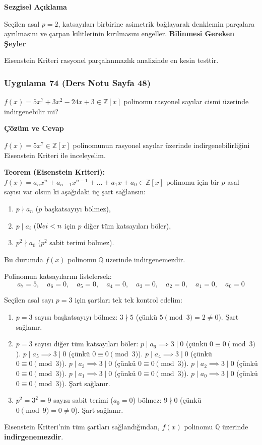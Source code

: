 \documentclass[11pt, a4paper]{article}
\newenvironment{cozum}{
    \vspace{0.5cm}
    \noindent\textcolor{green!60!black}{\faCheckCircle\enspace \textbf{\Large Çözüm ve Cevap}}\par\vspace{0.2cm}
}{}
\newenvironment{sezgisel}{
    \vspace{0.5cm}
    \noindent\textcolor{orange!80!black}{\faLightbulb\enspace \textbf{\Large Sezgisel Açıklama}}\par\vspace{0.2cm}
    \itshape
}{}
\newenvironment{bilgi}{
    \vspace{0.5cm}
    \noindent\textcolor{red!70!black}{\faExclamationTriangle\enspace \textbf{\Large Bilinmesi Gereken Şeyler}}\par\vspace{0.2cm}
}{}
\begin{document}
\begin{sezgisel}
Seçilen asal $p=2$, katsayıları birbirine asimetrik bağlayarak denklemin parçalara ayrılmasını ve çarpan kilitlerinin kırılmasını engeller.
\end{sezgisel}
\begin{bilgi}
Eisenstein Kriteri rasyonel parçalanmazlık analizinde en kesin testtir.
\end{bilgi}

\newpage
\subsubsection{Uygulama 74 (Ders Notu Sayfa 48)}
\begin{sorubox}
$f(x) = 5x^7 + 3x^2 - 24x + 3 \in \mathbb{Z}[x]$ polinomu rasyonel sayılar cismi üzerinde indirgenebilir mi?
\end{sorubox}
\begin{cozum}
$f(x) = 5x^{7} \in \mathbb{Z}[x]$ polinomunun rasyonel sayılar üzerinde indirgenebilirliğini Eisenstein Kriteri ile inceleyelim.

\textbf{Teorem (Eisenstein Kriteri):} $f(x) = a_n x^n + a_{n-1} x^{n-1} + \dots + a_1 x + a_0 \in \mathbb{Z}[x]$ polinomu için bir $p$ asal sayısı var olsun ki aşağıdaki üç şart sağlansın:
\begin{enumerate}
    \item $p \nmid a_n$ ($p$ başkatsayıyı bölmez),
    \item $p \mid a_i$ ($0 \\le i < n$ için $p$ diğer tüm katsayıları böler),
    \item $p^2 \nmid a_0$ ($p^2$ sabit terimi bölmez).
\end{enumerate}
Bu durumda $f(x)$ polinomu $\mathbb{Q}$ üzerinde indirgenemezdir.

Polinomun katsayılarını listelersek:
\[ a_{7} = 5, \quad a_{6} = 0, \quad a_{5} = 0, \quad a_{4} = 0, \quad a_{3} = 0, \quad a_{2} = 0, \quad a_{1} = 0, \quad a_{0} = 0 \]

Seçilen asal sayı $p = 3$ için şartları tek tek kontrol edelim:
\begin{enumerate}
    \item $p = 3$ sayısı başkatsayıyı bölmez: $3 \nmid 5$ (çünkü $5 \pmod{3} = 2 \neq 0$). Şart sağlanır.
    \item $p = 3$ sayısı diğer tüm katsayıları böler:
    $p \mid a_{6} \implies 3 \mid 0$ (çünkü $0 \equiv 0 \pmod{3}$).
    $p \mid a_{5} \implies 3 \mid 0$ (çünkü $0 \equiv 0 \pmod{3}$).
    $p \mid a_{4} \implies 3 \mid 0$ (çünkü $0 \equiv 0 \pmod{3}$).
    $p \mid a_{3} \implies 3 \mid 0$ (çünkü $0 \equiv 0 \pmod{3}$).
    $p \mid a_{2} \implies 3 \mid 0$ (çünkü $0 \equiv 0 \pmod{3}$).
    $p \mid a_{1} \implies 3 \mid 0$ (çünkü $0 \equiv 0 \pmod{3}$).
    $p \mid a_{0} \implies 3 \mid 0$ (çünkü $0 \equiv 0 \pmod{3}$).
    Şart sağlanır.
    \item $p^2 = 3^2 = 9$ sayısı sabit terimi ($a_0 = 0$) bölmez: $9 \nmid 0$ (çünkü $0 \pmod{9} = 0 \neq 0$). Şart sağlanır.
\end{enumerate}

Eisenstein Kriteri'nin tüm şartları sağlandığından, $f(x)$ polinomu $\mathbb{Q}$ üzerinde \textbf{indirgenemezdir}.
\end{cozum}
\end{document}
